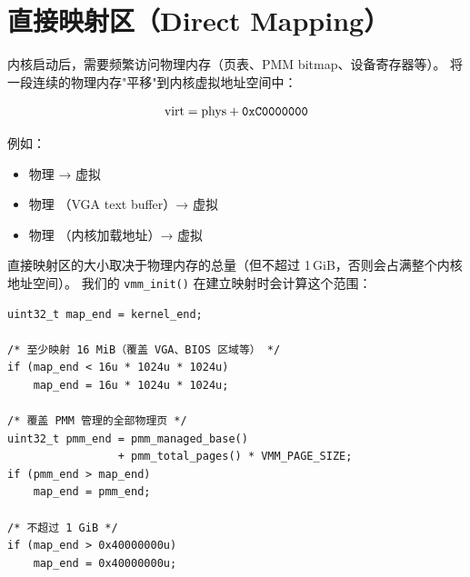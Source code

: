 \section{直接映射区（Direct Mapping）}

内核启动后，需要频繁访问物理内存（页表、PMM bitmap、设备寄存器等）。
将一段连续的物理内存"平移"到内核虚拟地址空间中：

\begin{equation}
\text{virt} = \text{phys} + \texttt{0xC0000000}
\label{eq:direct-map}
\end{equation}

例如：
\begin{itemize}
  \item 物理  → 虚拟 
  \item 物理 （VGA text buffer）→ 虚拟 
  \item 物理 （内核加载地址）→ 虚拟 
\end{itemize}

直接映射区的大小取决于物理内存的总量（但不超过 1\,GiB，否则会占满整个内核地址空间）。
我们的 \texttt{vmm\_init()} 在建立映射时会计算这个范围：

\begin{lstlisting}[style=cstyle, caption={直接映射范围计算（vmm.c 节选）}]
uint32_t map_end = kernel_end;

/* 至少映射 16 MiB（覆盖 VGA、BIOS 区域等） */
if (map_end < 16u * 1024u * 1024u)
    map_end = 16u * 1024u * 1024u;

/* 覆盖 PMM 管理的全部物理页 */
uint32_t pmm_end = pmm_managed_base()
                 + pmm_total_pages() * VMM_PAGE_SIZE;
if (pmm_end > map_end)
    map_end = pmm_end;

/* 不超过 1 GiB */
if (map_end > 0x40000000u)
    map_end = 0x40000000u;
\end{lstlisting}


